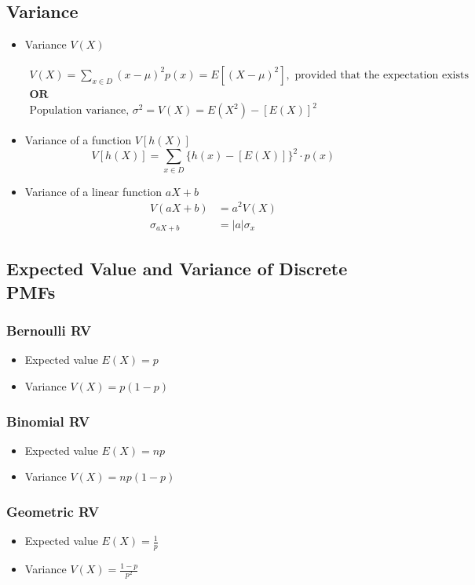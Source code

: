 \documentclass[a4paper]{article}
\begin{document}
\subsection{Variance}
\begin{itemize}
    \item Variance $V(X)$
    \begin{center}
        $\begin{matrix}
        V(X) = \sum_{x\in D}(x-\mu)^{2}p(x) = E[(X-\mu)^2], \text{ provided that the expectation exists}\\
        \textbf{OR}\\
        \text{Population variance, }\sigma^2 = V(X) = E(X^2)-[E(X)]^2
        \end{matrix}$
    \end{center}
    \item Variance of a function $V[h(X)]$
    $$V[h(X)] = \sum_{x\in D}\{h(x)-[E(X)]\}^{2}\cdot p(x)
    $$
    \item Variance of a linear function $aX + b$
    \begin{align*}
        V(aX + b) &= a^{2}V(X)\\
        \sigma_{aX+b} &= |a|\sigma_{x}
    \end{align*}
\end{itemize}
\subsection{Expected Value and Variance of Discrete PMFs}
\subsubsection{Bernoulli RV}
\begin{itemize}
    \item Expected value $E(X) = p$
    \item Variance $V(X) = p(1-p)$
\end{itemize}
\subsubsection{Binomial RV}
\begin{itemize}
    \item Expected value $E(X) = np$
    \item Variance $V(X) = np(1-p)$ 
\end{itemize}
\subsubsection{Geometric RV}
\begin{itemize}
    \item Expected value $E(X) = \displaystyle\frac{1}{p}$
    \item Variance $V(X) = \displaystyle\frac{1-p}{p^2}$
\end{itemize}
\end{document}
